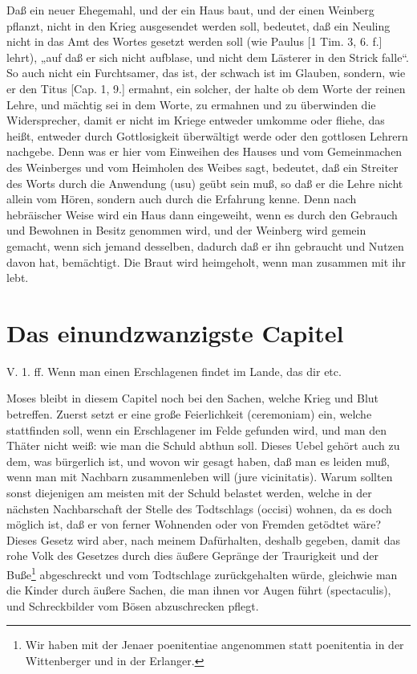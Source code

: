 Daß ein neuer Ehegemahl, und der ein Haus baut, und der einen Weinberg pflanzt, nicht in den Krieg ausgesendet werden soll, bedeutet, daß ein Neuling nicht in das Amt des Wortes gesetzt werden soll (wie Paulus [1 Tim. 3, 6. f.] lehrt), „auf daß er sich nicht aufblase, und nicht dem Lästerer in den Strick falle“. So auch nicht ein Furchtsamer, das ist, der schwach ist im Glauben, sondern, wie er den Titus [Cap. 1, 9.] ermahnt, ein solcher, der halte ob dem Worte der reinen Lehre, und mächtig sei in dem Worte, zu ermahnen und zu überwinden die Widersprecher, damit er nicht im Kriege entweder umkomme oder fliehe, das heißt, entweder durch Gottlosigkeit überwältigt werde oder den gottlosen Lehrern nachgebe. Denn was er hier vom Einweihen des Hauses und vom Gemeinmachen des Weinberges und vom Heimholen des Weibes sagt, bedeutet, daß ein Streiter des Worts durch die Anwendung (usu) geübt sein muß, so daß er die Lehre nicht allein vom Hören, sondern auch durch die Erfahrung kenne. Denn nach hebräischer Weise wird ein Haus dann eingeweiht, wenn es durch den Gebrauch und Bewohnen in Besitz genommen wird, und der Weinberg wird gemein gemacht, wenn sich jemand desselben, dadurch daß er ihn gebraucht und Nutzen davon hat, bemächtigt. Die Braut wird heimgeholt, wenn man zusammen mit ihr lebt.

\section{Das einundzwanzigste Capitel}

\begin{schriftzitat}
V. 1. ff. Wenn man einen Erschlagenen findet im Lande, das dir etc.
\end{schriftzitat}

Moses bleibt in diesem Capitel noch bei den Sachen, welche Krieg und Blut betreffen. Zuerst setzt er eine große Feierlichkeit (ceremoniam) ein, welche stattfinden soll, wenn ein Erschlagener im Felde gefunden wird, und man den Thäter nicht weiß: wie man die Schuld abthun soll. Dieses Uebel gehört auch zu dem, was bürgerlich ist, und wovon wir gesagt haben, daß man es leiden muß, wenn man mit Nachbarn zusammenleben will (jure vicinitatis). Warum sollten sonst diejenigen am meisten mit der Schuld belastet werden, welche in der nächsten Nachbarschaft der Stelle des Todtschlags (occisi) wohnen, da es doch möglich ist, daß er von ferner Wohnenden oder von Fremden getödtet wäre? Dieses Gesetz wird aber, nach meinem Dafürhalten, deshalb gegeben, damit das rohe Volk des Gesetzes durch dies äußere Gepränge der Traurigkeit und der Buße\footnote{Wir haben mit der Jenaer poenitentiae angenommen statt poenitentia in der Wittenberger und in der Erlanger.} abgeschreckt und vom Todtschlage zurückgehalten würde, gleichwie man die Kinder durch äußere Sachen, die man ihnen vor Augen führt (spectaculis), und Schreckbilder vom Bösen abzuschrecken pflegt.

